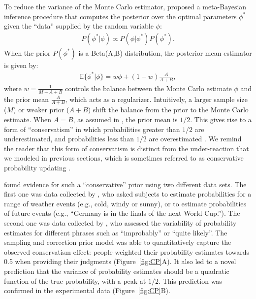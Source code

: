 To reduce the variance of the Monte Carlo estimator, \citet{zhu_sanborn_chater_2018} proposed a meta-Bayesian inference procedure that computes the posterior over the optimal parameters $\phi^\ast$ given the ``data'' supplied by the random variable $\phi$:
\begin{align}
    P(\phi^\ast|\phi) \propto P(\phi|\phi^\ast) P(\phi^\ast).
\end{align}
When the prior $P(\phi^\ast)$ is a Beta(A,B) distribution, the posterior mean estimator is given by:
\begin{align}
    \mathbb{E}\{ \phi^\ast|\phi \} = w \phi + (1-w) \frac{A}{A + B},
\end{align}
where $w = \frac{1}{M + A +B}$ controls the balance between the Monte Carlo estimate $\phi$ and the prior mean $\frac{A}{A+B}$, which acts as a regularizer. Intuitively, a larger sample size ($M$) or weaker prior ($A+B$) shift the balance from the prior to the Monte Carlo estimate. When $A=B$, as assumed in \citet{zhu_sanborn_chater_2018}, the prior mean is $1/2$. This gives rise to a form of ``conservatism'' in which probabilities greater than $1/2$ are underestimated, and probabilities less than $1/2$ are overestimated \citep{erev1994simultaneous,hilbert12}. We remind the reader that this form of conservatism is distinct from the under-reaction that we modeled in previous sections, which is sometimes referred to as conservative probability updating \citep{edwards1968conservatism}.

\cite{zhu_sanborn_chater_2018} found evidence for such a ``conservative'' prior using two different data sets. The first one was data collected by \cite{costello2018surprising}, who asked subjects to estimate probabilities for a range of weather events (e.g., cold, windy or sunny), or to estimate probabilities of future events (e.g., ``Germany is in the finals of the next World Cup.''). The second one was data collected by \cite{stewart2006decision}, who assessed the variability of probability estimates for different phrases such as ``improbably'' or ``quite likely''. The sampling and correction prior model was able to quantitatively capture the observed conservatism effect: people weighted their probability estimates towards 0.5 when providing their judgments (Figure~\ref{fig:CP}A). It also led to a novel prediction that the variance of probability estimates should be a quadratic function of the true probability, with a peak at $1/2$. %
This prediction was confirmed in the experimental data (Figure~\ref{fig:CP}B).

